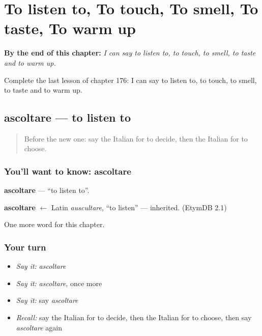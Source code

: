 
\chapter{To listen to, To touch, To smell, To taste, To warm up}
\label{ch:it-to-listen-to-to-touch-to-smell-to-taste-to-warm-up}

\begin{chapteropening}
\textbf{By the end of this chapter:} \emph{I can say to listen to, to touch, to smell, to taste and to warm up.}

Complete the last lesson of chapter 176: I can say to listen to, to touch, to smell, to taste and to warm up.
\end{chapteropening}

\section[ascoltare]{ascoltare — to listen to}

\label{lesson:IT-C176-ascoltare}



\begin{quote}
Before the new one: say the Italian for to decide, then the Italian for to choose.
\end{quote}

\subsection*{You'll want to know: ascoltare}
\textbf{ascoltare} — \textquotedblleft{}to listen to\textquotedblright{}.

\begin{cousinweb}
\textbf{ascoltare} $\leftarrow$ Latin \emph{auscultare}, \textquotedblleft{}to listen\textquotedblright{} — inherited. (EtymDB 2.1)
\end{cousinweb}

\begin{grammarlens}[title={What you've built}]
One more word for this chapter.
\end{grammarlens}

\subsection*{Your turn}
\begin{itemize}
\raggedright
  \item \emph{Say it:} \emph{ascoltare}
  \item \emph{Say it:} \emph{ascoltare}, once more
  \item \emph{Say it:} say \emph{ascoltare}
  \item \emph{Recall:} say the Italian for to decide, then the Italian for to choose, then say \emph{ascoltare} again
\end{itemize}

